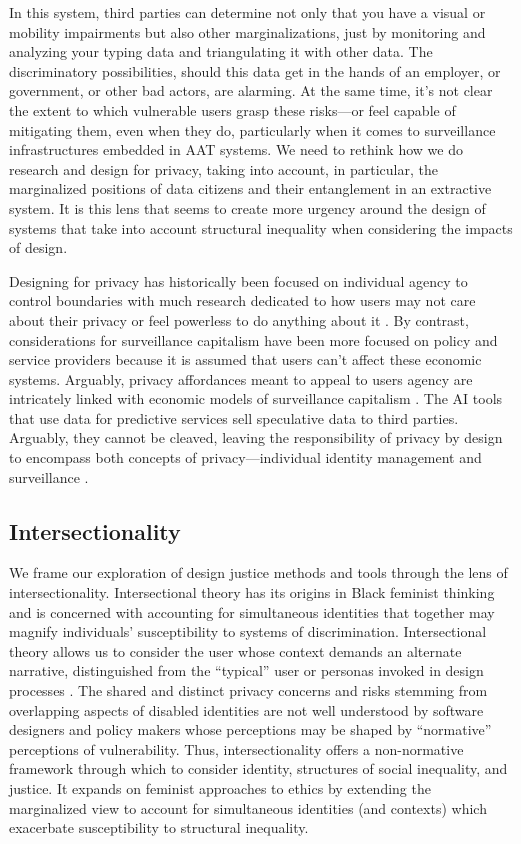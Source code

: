 \documentclass[11pt,dvipdfm]{article}
\begin{document}
In this system, third parties can determine not only that you have a visual or mobility impairments but also other marginalizations, just by monitoring and analyzing your typing data and triangulating it with other data. The discriminatory possibilities, should this data get in the hands of an employer, or government, or other bad actors, are alarming. At the same time, it’s not clear the extent to which vulnerable users grasp these risks—or feel capable of mitigating them, even when they do, particularly when it comes to surveillance infrastructures \cite{22} embedded in AAT systems. We need to rethink how we do research and design for privacy, taking into account, in particular, the marginalized positions of data citizens and their entanglement in an extractive system. It is this lens that seems to create more urgency around the design of systems that take into account structural inequality when considering the impacts of design.   

Designing for privacy has historically been focused on individual agency to control boundaries \cite{1,43,50} with much research dedicated to how users may not care about their privacy \cite{3,30} or feel powerless to do anything about it \cite{28,36}. By contrast, considerations for surveillance capitalism have been more focused on policy and service providers because it is assumed that users can’t affect these economic systems. Arguably, privacy affordances meant to appeal to users agency are intricately linked with economic models of surveillance capitalism \cite{38}. The AI tools that use data for predictive services sell speculative data to third parties. Arguably, they cannot be cleaved, leaving the responsibility of privacy by design to encompass both concepts of privacy—individual identity management and surveillance \cite{44}. 

\subsection{Intersectionality}
We frame our exploration of design justice methods and tools through the lens of intersectionality. Intersectional theory has its origins in Black feminist thinking and is concerned with accounting for simultaneous identities that together may magnify individuals’ susceptibility to systems of discrimination. Intersectional theory allows us to consider the user whose context demands an alternate narrative, distinguished from the “typical” user or personas invoked in design processes \cite{46}. The shared and distinct privacy concerns and risks stemming from overlapping aspects of disabled identities are not well understood by software designers and policy makers whose perceptions may be shaped by “normative” perceptions of vulnerability. Thus, intersectionality offers a non-normative framework through which to consider identity, structures of social inequality, and justice. It expands on feminist approaches to ethics by extending the marginalized view to account for simultaneous identities (and contexts) which exacerbate susceptibility to structural inequality. 
\end{document}
